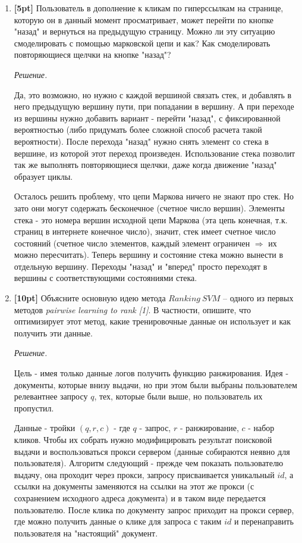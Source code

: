 \begin{enumerate}
	\item \textbf{[5pt]} Пользователь в дополнение к кликам по гиперссылкам на странице, которую 
	он в данный момент просматривает, может перейти по кнопке "назад" и вернуться на предыдущую 
	страницу. Можно ли эту ситуацию смоделировать с помощью марковской цепи и как? Как 
	смоделировать повторяющиеся щелчки на кнопке "назад"?
	
	\textit{Решение.}
	
	Да, это возможно, но нужно с каждой вершиной связать стек, и добавлять в него предыдущую 
	вершину пути, при попадании в вершину. А при переходе из вершины нужно добавить вариант - 
	перейти "назад", с фиксированной вероятностью (либо придумать более сложной способ расчета 
	такой вероятности). После перехода "назад" нужно снять элемент со стека в вершине, из которой 
	этот переход произведен. Использование стека позволит так же выполнять повторяющиеся щелчки, 
	даже когда движение "назад" образует циклы. 
	
	Осталось решить проблему, что цепи Маркова ничего не знают про стек. Но зато они могут 
	содержать бесконечное (счетное число вершин). Элементы стека - это номера вершин исходной цепи 
	Маркова (эта цепь конечная, т.к. страниц в интернете конечное число), значит, стек имеет 
	счетное число состояний (счетное число элементов, каждый элемент ограничен $\Rightarrow$ их 
	можно пересчитать). Теперь вершину и состояние стека можно вынести в отдельную вершину. 
	Переходы "назад" и "вперед" просто переходят в вершины с соответствующими состояниями стека.

	\item \textbf{[10pt]} Объясните основную идею метода $Ranking \ SVM$ – одного из первых 
	методов	\textit{pairwise learning to rank [1]}. В частности, опишите, что оптимизирует этот 
	метод, какие тренировочные данные он использует и как получить эти данные.
	
	\textit{Решение.}
	
	Цель - имея только данные логов получить функцию ранжирования. Идея - документы, которые внизу выдачи, но при этом были выбраны пользователем релевантнее запросу $q$, тех, которые были выше, но пользователь их пропустил.
	
	Данные - тройки $(q, r, c)$ - где $q$ - запрос, $r$ - ранжирование, $c$ - набор кликов. Чтобы 
	их собрать нужно модифицировать результат поисковой выдачи и воспользоваться прокси сервером 
	(данные собираются неявно для пользователя). Алгоритм следующий - прежде чем показать 
	пользователю выдачу, она проходит через прокси, запросу присваивается уникальный $id$, а 
	ссылки на документы заменяются на ссылки на этот же прокси (с сохранением исходного адреса 
	документа) и в таком виде передается пользователю. После клика по документу запрос приходит на 
	прокси сервер, где можно получить данные о клике для запроса с таким $id$ и перенаправить 
	пользователя на "настоящий" документ.
	

\end{enumerate}

